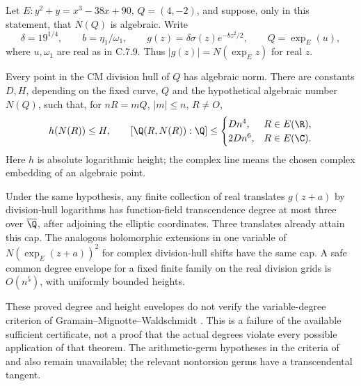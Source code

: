 \begin{statement}
Let $E:y^2+y=x^3-38x+90$, $Q=(4,-2)$, and suppose, only in
this statement, that $N(Q)$ is algebraic.  Write
\[
 \delta=19^{1/4},\qquad b=\eta_1/\omega_1,\qquad
 g(z)=\delta\sigma(z)e^{-bz^2/2},\qquad Q=\exp_E(u),
\]
where $u,\omega_1$ are real as in C.7.9.  Thus
$|g(z)|=N(\exp_E z)$ for real $z$.

Every point in the CM division hull of $Q$ has algebraic norm.
There are constants $D,H$, depending on the fixed curve, $Q$ and
the hypothetical algebraic number $N(Q)$, such that, for
$nR=mQ$, $|m|\leq n$, $R\ne O$,
\[
 h(N(R))\leq H,
 \qquad
 [\Q(R,N(R)):\Q]\leq
 \begin{cases}Dn^4,&R\in E(\R),\\2Dn^6,&R\in E(\C).
 \end{cases}
\]
Here $h$ is absolute logarithmic height; the complex line means
the chosen complex embedding of an algebraic point.

Under the same hypothesis, any finite collection of real translates
$g(z+a)$ by division-hull logarithms has function-field
transcendence degree at most three over $\overline\Q$, after
adjoining the elliptic coordinates.  Three translates already
attain this cap.  The analogous holomorphic extensions in one
variable of $N(\exp_E(z+a))^2$ for complex division-hull shifts
have the same cap.  A safe common degree envelope for a fixed
finite family on the real division grids is $O(n^5)$, with
uniformly bounded heights.

These proved degree and height envelopes do not verify the
variable-degree criterion of Gramain--Mignotte--Waldschmidt
\citep[Theorem 2.1]{gramain1986values}.  This is a failure of the
available sufficient certificate, not a proof that the actual
degrees violate every possible application of that theorem.
The arithmetic-germ hypotheses in the criteria of
\citet[Theorem 6.1]{herblot2012meromorphic} and
\citet[Theorem 4.16]{gasbarri2010analytic} also remain unavailable;
the relevant nontorsion germs have a transcendental tangent.
\end{statement}

